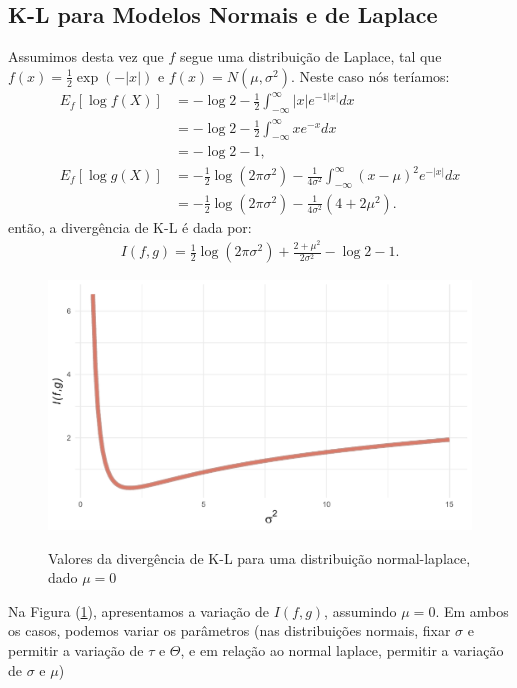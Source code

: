 \subsection{K-L para Modelos Normais e de Laplace}
\label{laplace}

Assumimos desta vez que $f$ segue uma distribuição de Laplace, tal que $f(x) = \frac{1}{2}\exp(-|x|)$ e $f(x) = N(\mu, \sigma^2)$. Neste caso nós teríamos:
\begin{align*}
    E_f[\log f(X)] &= -\log 2 - \frac{1}{2}\int_{-\infty}^{\infty}|x|e^{-1|x|}dx\\
                   &= -\log 2 - \frac{1}{2}\int_{-\infty}^{\infty}xe^{-x}dx\\
                   &= -\log 2 -1,\\
    E_f[\log g(X)] &= -\frac{1}{2}\log(2\pi\sigma^2) - \frac{1}{4\sigma^2}\int_{-\infty}^{\infty}(x - \mu)^2e^{-|x|}dx\\
                   &= -\frac{1}{2}\log(2\pi\sigma^2) - \frac{1}{4\sigma^2}(4 + 2\mu^2).
\end{align*}
então, a divergência de K-L é dada por:
\begin{align*}
    I(f,g) = \frac{1}{2}\log(2\pi\sigma^2) + \frac{2 + \mu^2}{2\sigma^2} - \log 2 - 1.
\end{align*}

\begin{figure}[!h]
    \centering
    \caption{Valores da divergência de K-L para uma distribuição normal-laplace, dado $\mu = 0$}
    \includegraphics[width=.8\textwidth]{capitulos/figures/kllaplace.pdf}
    \label{fig:laplacesomente}
\end{figure}


Na Figura (\ref{fig:laplacesomente}), apresentamos a variação de $I(f,g)$, assumindo $\mu=0$. Em ambos os casos, podemos variar os parâmetros (nas distribuições normais, fixar $\sigma$ e permitir a variação de $\tau$ e $\Theta$, e em relação ao normal laplace, permitir a variação de $\sigma$ e $\mu$)

